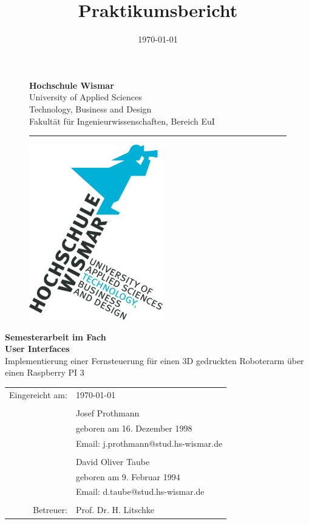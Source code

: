 \documentclass[12pt,					%
							 oneside,			%
							 a4paper,			%
							 halfparskip,		%
							 liststotoc,			%
							 bibtotoc,			%
							 fleqn,				%
							 pointlessnumbers]	%
							 {scrreprt}
\title{Praktikumsbericht}
\author{\Verfasserj \VerfasserD}
\date{\today{}}
\makeatletter
\newcommand{\VerfasserJ}{Josef Prothmann}
\newcommand{\EmailJ}{j.prothmann@stud.hs-wismar.de}
\newcommand{\GeburtstagJ}{16. Dezember 1998}
\newcommand{\VerfasserD}{David Oliver Taube}
\newcommand{\EmailD}{d.taube@stud.hs-wismar.de}
\newcommand{\GeburtstagD}{9. Februar 1994}
\newcommand{\Titel}{Implementierung einer Fernsteuerung für einen 3D gedruckten Roboterarm über einen Raspberry PI 3}
\newcommand{\Betreuer}{Prof. Dr. H. Litschke}
\makeatother
\begin{document}

	\renewcommand\lstlistingname{Code}
	\renewcommand\lstlistlistingname{Codeverzeichnis}
	
	\begin{titlepage}
		\setlength\headsep{-5mm}
		\begin{figure}[!h]
			\begin{minipage}{0.8\textwidth}
				\textbf{Hochschule Wismar} \\
				University of Applied Sciences \\
				Technology, Business and Design \\
				Fakultät für Ingenieurwissenschaften, Bereich EuI \\
			\rule{\textwidth}{0.5pt}
			\end{minipage}
			\begin{minipage}[r]{0.1\textwidth}
				\begin{flushright}
					\includegraphics[height=6\baselineskip]{pictures/HS-Wismar_Logo-FIW_2010-01.jpg}
				\end{flushright}
			\end{minipage}
		\end{figure}
		\vspace*{6cm}
		\begin{center}
			\Huge
			\textbf{Semesterarbeit im Fach\\ User Interfaces} \\
			\vspace{2cm}
			\large \Titel
			\begin{table}[b]
				\begin{tabular}{rl}
					
					Eingereicht am: &\today \\
					\\
					& \VerfasserJ \\ 
					& geboren am \GeburtstagJ \\ 
					& Email: \EmailJ \\
					\\
					& \VerfasserD\\ 
					& geboren am \GeburtstagD \\ 
					& Email: \EmailD \\
					\\
					Betreuer: & \Betreuer \\


\end{tabular}
\end{table}
\end{center}
\end{titlepage}
\end{document}

